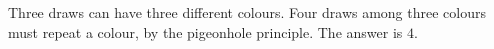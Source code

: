 Three draws can have three different colours. Four draws among three colours must repeat a colour, by the pigeonhole principle. The answer is $\boxed4$.
